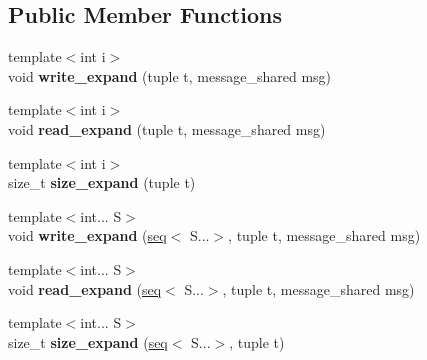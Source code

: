 \subsection*{\-Public \-Member \-Functions}
\begin{DoxyCompactItemize}
\item 
\hypertarget{classgal_1_1network_1_1vector__ext_a939f4207902372496e63b9928b399129}{{\footnotesize template$<$int i$>$ }\\void {\bfseries write\-\_\-expand} (tuple t, message\-\_\-shared msg)}\label{classgal_1_1network_1_1vector__ext_a939f4207902372496e63b9928b399129}

\item 
\hypertarget{classgal_1_1network_1_1vector__ext_a7536e046bfdfcc2546929f0cbb899d5f}{{\footnotesize template$<$int i$>$ }\\void {\bfseries read\-\_\-expand} (tuple t, message\-\_\-shared msg)}\label{classgal_1_1network_1_1vector__ext_a7536e046bfdfcc2546929f0cbb899d5f}

\item 
\hypertarget{classgal_1_1network_1_1vector__ext_afdb06e31b1925621ae74abefdeffbfbf}{{\footnotesize template$<$int i$>$ }\\size\-\_\-t {\bfseries size\-\_\-expand} (tuple t)}\label{classgal_1_1network_1_1vector__ext_afdb06e31b1925621ae74abefdeffbfbf}

\item 
\hypertarget{classgal_1_1network_1_1vector__ext_a5d5973d02bea3a06c8967d8322d468fd}{{\footnotesize template$<$int... \-S$>$ }\\void {\bfseries write\-\_\-expand} (\hyperlink{structseq}{seq}$<$ \-S...$>$, tuple t, message\-\_\-shared msg)}\label{classgal_1_1network_1_1vector__ext_a5d5973d02bea3a06c8967d8322d468fd}

\item 
\hypertarget{classgal_1_1network_1_1vector__ext_a8c931a009f25967b60c08e22db9156e4}{{\footnotesize template$<$int... \-S$>$ }\\void {\bfseries read\-\_\-expand} (\hyperlink{structseq}{seq}$<$ \-S...$>$, tuple t, message\-\_\-shared msg)}\label{classgal_1_1network_1_1vector__ext_a8c931a009f25967b60c08e22db9156e4}

\item 
\hypertarget{classgal_1_1network_1_1vector__ext_a82e2e595a33e267c78a32d1e54516933}{{\footnotesize template$<$int... \-S$>$ }\\size\-\_\-t {\bfseries size\-\_\-expand} (\hyperlink{structseq}{seq}$<$ \-S...$>$, tuple t)}\label{classgal_1_1network_1_1vector__ext_a82e2e595a33e267c78a32d1e54516933}


\end{DoxyCompactItemize}
